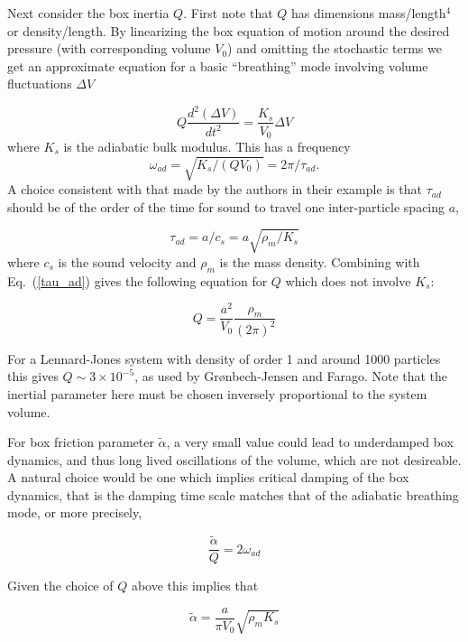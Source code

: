 \documentclass[a4paper]{article}
\begin{document}
Next consider the box inertia $Q$. First note that $Q$ has dimensions mass/length$^4$ or density/length. By linearizing the box equation of motion around the desired pressure (with corresponding volume $V_0$) and omitting the stochastic terms we get an approximate equation for a basic ``breathing'' mode involving volume fluctuations $\Delta V$

\begin{equation}
Q \frac{d^2 (\Delta V)}{dt^2} = \frac{K_s}{V_0} \Delta V
\end{equation}
where $K_s$ is the adiabatic bulk modulus. This has a frequency
\begin{equation}\label{tau_ad}
  \omega_{ad}=\sqrt{K_s/(QV_0)}=2\pi/\tau_{ad}.
\end{equation}
A choice consistent with that made by the authors in their example is that $\tau_{ad}$ should be of the order of the time for sound to travel one inter-particle spacing $a$,

\begin{equation}
  \tau_{ad} = a/c_s = a \sqrt{\rho_m/K_s}
  \end{equation}
where $c_s$ is the sound velocity and $\rho_m$ is the mass density. Combining with Eq.~(\ref{tau_ad}) gives the following equation for $Q$ which does not involve $K_s$:

\begin{equation}
Q = \frac{a^2}{V_0} \frac{\rho_m}{(2\pi)^2}
\end{equation}

For a Lennard-Jones system with density of order 1 and around 1000 particles this gives $Q \sim 3  \times 10^{-5}$, as used by Gr{\o}nbech-Jensen and Farago. Note that the inertial parameter here must be chosen inversely proportional to the system volume.

For box friction parameter $\tilde\alpha$, a very small value could lead to underdamped box dynamics, and thus long lived oscillations of the volume, which are not desireable. A natural choice would be one which implies critical damping of the box dynamics, that is the damping time scale matches that of the adiabatic breathing mode, or more precisely,

\begin{equation}
 \frac{\tilde\alpha}{Q} = 2\omega_{ad} 
\end{equation}

Given the choice of $Q$ above this implies that

\begin{equation} \label{tilde_alpha}
\tilde\alpha = \frac{a}{\pi V_0} \sqrt{\rho_m K_s}
\end{equation}
\end{document}
